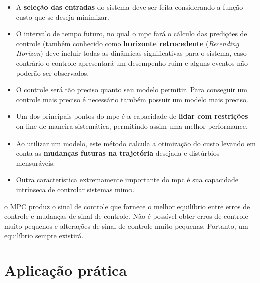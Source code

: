 \begin{itemize}
    \item A \textbf{seleção das entradas} do sistema deve ser feita considerando a função custo que se
            deseja minimizar.

    \item O intervalo de tempo futuro, no qual o \acrshort{mpc} fará o cálculo das predições de controle
            (também conhecido como \textbf{horizonte retrocedente} (\textit{Recending Horizon}) deve
            incluir todas as dinâmicas significativas para o sistema, caso contrário o controle apresentará
            um desempenho ruim e alguns eventos não poderão ser observados.

    \item O controle será tão preciso quanto seu modelo permitir. Para conseguir um controle mais preciso
            é necessário também possuir um modelo mais preciso.

    \item Um dos principais pontos do \acrshort{mpc} é a capacidade de \textbf{lidar com restrições} on-line
            de maneira sistemática, permitindo assim uma melhor performance.

    \item Ao utilizar um modelo, este método calcula a otimização do custo levando em conta as
            \textbf{mudanças futuras na trajetória} desejada e distúrbios mensuráveis.

    \item Outra característica extremamente importante do \acrshort{mpc} é sua capacidade intrínseca de
            controlar sistemas \acrshort{mimo}.
    
\end{itemize}

o MPC produz o sinal de controle que fornece o melhor equilíbrio entre erros de controle e mudanças
de sinal de controle. Não é possível obter erros de controle muito pequenos e alterações de sinal de
controle muito pequenas. Portanto, um equilíbrio sempre existirá.

\section{Aplicação prática}
\label{sec:aplicacao_pratica}

